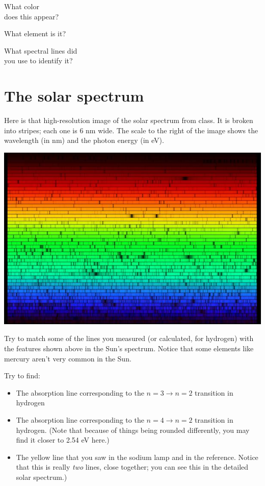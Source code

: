 \documentclass[11pt]{article}
\begin{document}
\begin{minipage}{0.33\textwidth}
	What color \\does this appear?
\end{minipage}
\begin{minipage}{0.33\textwidth}
	What element is it?
\end{minipage}
\begin{minipage}{0.33\textwidth}
	What spectral lines did\\
	you use to identify it?
\end{minipage}

\vspace{1.2in}

\newpage

\section{The solar spectrum}

Here is that high-resolution image of the solar spectrum from class. It is broken into stripes; each one is 6 nm
wide. The scale to the right of the image shows the wavelength (in nm) and the photon energy (in eV).
\begin{center}
\includegraphics[width=1.0\textwidth]{solarspectrum.jpg}
\end{center}

Try to match some of the lines you measured (or calculated, for hydrogen) with the features shown above
in the Sun's spectrum. Notice that some elements like mercury aren't very common in the Sun.

Try to find:

\begin{itemize}
\item The absorption line corresponding to the $n=3 \rightarrow n=2$ transition in hydrogen
\item The absorption line corresponding to the $n=4 \rightarrow n=2$ transition in hydrogen. (Note that because of things being rounded differently, you may find it closer to 2.54 eV here.)
\item The yellow line that you saw in the sodium lamp and in the reference. Notice that this is really
{\it two} lines, close together; you can see this in the detailed solar spectrum.)
\end{itemize}
\end{document}
